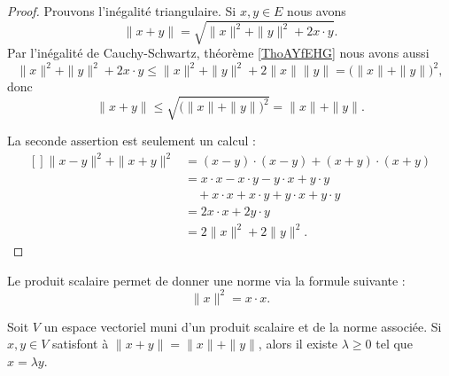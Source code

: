 \begin{proof}

    Prouvons l'inégalité triangulaire. Si \( x,y\in E\) nous avons
    \begin{equation}
        \| x+y \|=\sqrt{\| x \|^2+\| y \|^2+2x\cdot y}.
    \end{equation}
    Par l'inégalité de Cauchy-Schwartz, théorème \ref{ThoAYfEHG} nous avons aussi
    \begin{equation}
        \| x \|^2+\| y \|^2+2x\cdot y\leq \| x \|^2+\| y \|^2+2\| x \|\| y \|=\big( \| x \|+\| y \| \big)^2,
    \end{equation}
    donc
    \begin{equation}
        \| x+y \|\leq \sqrt{\big( \| x \|+\| y \| \big)^2}=\| x \|+\| y \|.
    \end{equation}

    La seconde assertion est seulement un calcul :
			\begin{equation}
				\begin{aligned}[]
					\| x-y \|^2+\| x+y \|^2&=(x-y)\cdot (x-y)+(x+y)\cdot(x+y)\\
					&=x\cdot x-x\cdot y-y\cdot x+y\cdot y\\
					&\quad +x\cdot x+x\cdot y+y\cdot x+y\cdot y\\
					&=2x\cdot x+2y\cdot y\\
					&=2\| x \|^2+2\| y \|^2.
				\end{aligned}
			\end{equation}
\end{proof}

Le produit scalaire permet de donner une norme via la formule suivante :
\begin{equation}
    \| x \|^2=x\cdot x.
\end{equation}

\begin{lemma}   \label{LemLPOHUme}
    Soit \( V\) un espace vectoriel muni d'un produit scalaire et de la norme associée. Si \( x,y\in V\) satisfont à \( \| x+y \|=\| x \|+\| y \|\), alors il existe \( \lambda\geq 0\) tel que \( x=\lambda y\).
\end{lemma}

